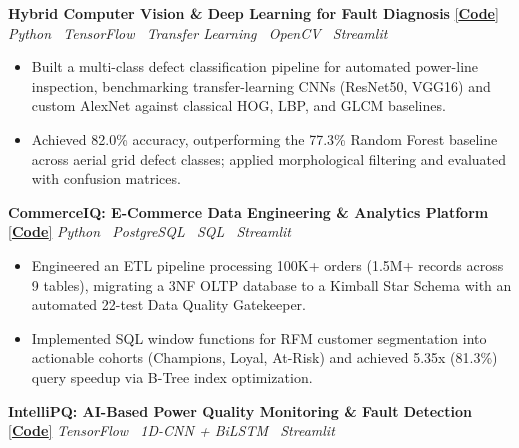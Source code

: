 \documentclass[10pt]{article}
\newcommand{\project}[3]{%
    \noindent
    \textbf{#1}
    \hspace{2pt}
    \href{#2}{\small[\textbf{Code}]}
    \hfill
    {\small\emph{#3}}
    \par
    \vspace{1pt}
}
\begin{document}
\project
{Hybrid Computer Vision \& Deep Learning for Fault Diagnosis}
{https://github.com/niranjan-crypt/Hybrid-Computer-Vision-and-Deep-Learning-for-Automated-Power-Transmission-Fault-Detection}
{Python \textbullet\ TensorFlow \textbullet\ Transfer Learning \textbullet\ OpenCV \textbullet\ Streamlit}

\begin{itemize}

\item Built a multi-class defect classification pipeline for automated power-line inspection, benchmarking transfer-learning CNNs (ResNet50, VGG16) and custom AlexNet against classical HOG, LBP, and GLCM baselines.

\item Achieved 82.0\% accuracy, outperforming the 77.3\% Random Forest baseline across aerial grid defect classes; applied morphological filtering and evaluated with confusion matrices.

\end{itemize}

\project
{CommerceIQ: E-Commerce Data Engineering \& Analytics Platform}
{https://github.com/niranjan-crypt/CommerceIQ}
{Python \textbullet\ PostgreSQL \textbullet\ SQL \textbullet\ Streamlit}

\begin{itemize}

\item Engineered an ETL pipeline processing 100K+ orders (1.5M+ records across 9 tables), migrating a 3NF OLTP database to a Kimball Star Schema with an automated 22-test Data Quality Gatekeeper.

\item Implemented SQL window functions for RFM customer segmentation into actionable cohorts (Champions, Loyal, At-Risk) and achieved 5.35x (81.3\%) query speedup via B-Tree index optimization.

\end{itemize}

\project
{IntelliPQ: AI-Based Power Quality Monitoring \& Fault Detection}
{https://github.com/niranjan-crypt/IntelliPQ-AI-Based-Power-Quality-Monitoring-Fault-Detection}
{TensorFlow \textbullet\ 1D-CNN + BiLSTM \textbullet\ Streamlit}
\end{document}
